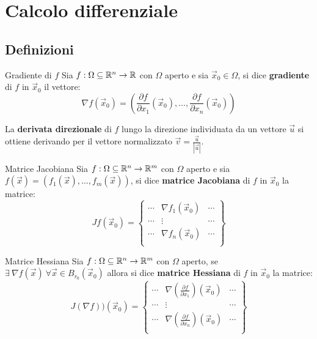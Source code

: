 \chapter{Calcolo differenziale}


\section{Definizioni}
	\begin{definizione}{Gradiente di $f$}
	Sia $f:\Omega \subseteq \mathbb{R}^n \rightarrow \mathbb{R}$ con $\Omega$ aperto e sia $\vec x_0 \in \Omega$, si dice \textbf{gradiente} di $f$ in $\vec x_0$ il vettore:
	$$\nabla f(\vec x_0)=\left( \frac{\partial f}{\partial x_1}(\vec x_0), \dots, \frac{\partial f}{\partial x_n}(\vec x_0)\right)$$
  \end{definizione}
	\begin{osservazione}{}
	La \textbf{derivata direzionale}  di $f$ lungo la direzione individuata da un vettore $\vec u$ si ottiene derivando per il vettore normalizzato $\vec v=\frac{\vec u}{|\vec u|}.$
  \end{osservazione}
	\begin{definizione}{Matrice Jacobiana}
	Sia $f:\Omega \subseteq \mathbb{R}^n \rightarrow \mathbb{R}^m$ con $\Omega$ aperto e sia $f(\vec x)=\left(f_1(\vec x), \dots, f_m(\vec x)\right)$, si dice \textbf{matrice Jacobiana} di $f$ in $\vec x_0$ la matrice:
	$$Jf(\vec x_0)=
	\begin{Bmatrix}
		\cdots & \nabla f_1(\vec x_0) & \cdots \\
		\cdots & \vdots  & \cdots \\
		\cdots & \nabla f_n(\vec x_0) & \cdots \\
	\end{Bmatrix} $$
\end{definizione}
	\begin{definizione}{Matrice Hessiana}
	Sia $f:\Omega \subseteq \mathbb{R}^n \rightarrow \mathbb{R}^m$ con $\Omega$ aperto, se $\exists \ \nabla f(\vec x)\ \forall \vec x \in B_{r_0}(\vec x_0)$ allora si dice \textbf{matrice Hessiana} di $f$ in $\vec x_0$ la matrice:
	$$J(\nabla f))(\vec x_0)=
	\begin{Bmatrix}
		\cdots & \nabla (\frac{\partial f}{\partial x_1})(\vec x_0) & \cdots \\
		\cdots & \vdots  & \cdots \\
		\cdots & \nabla (\frac{\partial f}{\partial x_n})(\vec x_0) & \cdots \\
	\end{Bmatrix} $$
  \end{definizione}
